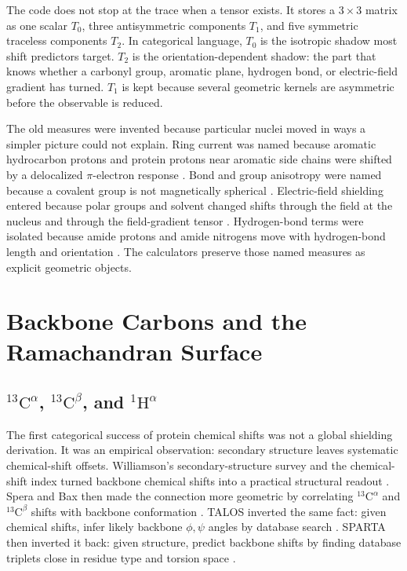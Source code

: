 \documentclass[11pt]{article}
\begin{document}
The code does not stop at the trace when a tensor exists. It stores a
\(3\times3\) matrix as one scalar \(T_0\), three antisymmetric components
\(T_1\), and five symmetric traceless components \(T_2\). In categorical
language, \(T_0\) is the isotropic shadow most shift predictors target.
\(T_2\) is the orientation-dependent shadow: the part that knows whether a
carbonyl group, aromatic plane, hydrogen bond, or electric-field gradient has
turned. \(T_1\) is kept because several geometric kernels are asymmetric before
the observable is reduced.

The old measures were invented because particular nuclei moved in ways a
simpler picture could not explain. Ring current was named because aromatic
hydrocarbon protons and protein protons near aromatic side chains were shifted
by a delocalized \(\pi\)-electron response
\cite{pople1956,johnson1958,haigh1979,case1995}. Bond and group anisotropy
were named because a covalent group is not magnetically spherical
\cite{mcconnell1957}. Electric-field shielding entered because polar groups and
solvent changed shifts through the field at the nucleus and through the
field-gradient tensor \cite{buckingham1960,hass2008,kukic2013}. Hydrogen-bond
terms were isolated because amide protons and amide nitrogens move with
hydrogen-bond length and orientation \cite{parker2006,mooncase2007,larsen2015}.
The calculators preserve those named measures as explicit geometric objects.

\section{Backbone Carbons and the Ramachandran Surface}

\subsection{\texorpdfstring{\(^{13}\mathrm C^\alpha\),
\(^{13}\mathrm C^\beta\), and \(^{1}\mathrm H^\alpha\)}
{13C-alpha, 13C-beta, and 1H-alpha}}

The first categorical success of protein chemical shifts was not a global
shielding derivation. It was an empirical observation: secondary structure
leaves systematic chemical-shift offsets. Williamson's secondary-structure
survey and the chemical-shift index turned backbone chemical shifts into a
practical structural readout \cite{williamson1990,wishart1992}. Spera and Bax
then made the connection more geometric by correlating
\(^{13}\mathrm C^\alpha\) and \(^{13}\mathrm C^\beta\) shifts with backbone
conformation \cite{spera1991}. TALOS inverted the same fact: given chemical
shifts, infer likely backbone \(\phi,\psi\) angles by database search
\cite{talos1999}. SPARTA then inverted it back: given structure, predict
backbone shifts by finding database triplets close in residue type and torsion
space \cite{shenbax2007}.
\end{document}

